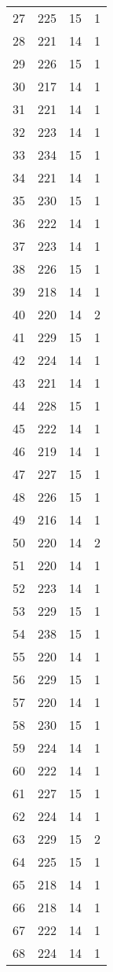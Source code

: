 \begin{longtable}[!]{c|ccc}
	27	& 225	& 15	& 1	\\
	28	& 221	& 14	& 1	\\
	29	& 226	& 15	& 1	\\
	30	& 217	& 14	& 1	\\
	31	& 221	& 14	& 1	\\
	32	& 223	& 14	& 1	\\
	33	& 234	& 15	& 1	\\
	34	& 221	& 14	& 1	\\
	35	& 230	& 15	& 1	\\
	36	& 222	& 14	& 1	\\
	37	& 223	& 14	& 1	\\
	38	& 226	& 15	& 1	\\
	39	& 218	& 14	& 1	\\
	40	& 220	& 14	& 2	\\
	41	& 229	& 15	& 1	\\
	42	& 224	& 14	& 1	\\
	43	& 221	& 14	& 1	\\
	44	& 228	& 15	& 1	\\
	45	& 222	& 14	& 1	\\
	46	& 219	& 14	& 1	\\
	47	& 227	& 15	& 1	\\
	48	& 226	& 15	& 1	\\
	49	& 216	& 14	& 1	\\
	50	& 220	& 14	& 2	\\
	51	& 220	& 14	& 1	\\
	52	& 223	& 14	& 1	\\
	53	& 229	& 15	& 1	\\
	54	& 238	& 15	& 1	\\
	55	& 220	& 14	& 1	\\
	56	& 229	& 15	& 1	\\
	57	& 220	& 14	& 1	\\
	58	& 230	& 15	& 1	\\
	59	& 224	& 14	& 1	\\
	60	& 222	& 14	& 1	\\
	61	& 227	& 15	& 1	\\
	62	& 224	& 14	& 1	\\
	63	& 229	& 15	& 2	\\
	64	& 225	& 15	& 1	\\
	65	& 218	& 14	& 1	\\
	66	& 218	& 14	& 1	\\
	67	& 222	& 14	& 1	\\
	68	& 224	& 14	& 1	\\

\end{longtable}
